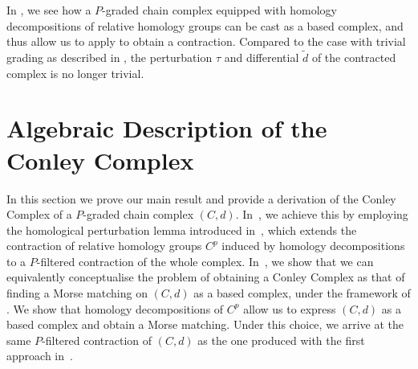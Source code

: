 \documentclass[11pt, table, nothms]{amsart}
\theoremstyle{definition}
\begin{document}
{In , we see how a $P$-graded chain complex equipped with homology decompositions of relative homology groups can be cast as a based complex, and thus allow us to apply  to obtain a contraction. Compared to the case with trivial grading as described in , the perturbation $\tau$ and  differential $\widetilde{d}$  of the contracted complex is no longer trivial. 


\section{Algebraic Description of the Conley Complex}
In this section we prove our main result and provide a derivation of the Conley Complex of a $P$-graded chain complex $(C,d)$. In~, we achieve this by employing the homological perturbation lemma introduced in~, which extends the contraction of relative homology groups $C^p$ induced by homology decompositions to a $P$-filtered contraction of the whole complex. In~, we show that we can equivalently conceptualise the problem of obtaining a Conley Complex as that of finding a Morse matching on $(C,d)$ as a based complex, under the framework of . We show that homology decompositions of $C^p$ allow us to express $(C,d)$ as a based complex and obtain a Morse matching. Under this choice, we arrive at the same $P$-filtered contraction of $(C,d)$ as the one produced with the first approach in~.

\label{sec:connectionmatrix}
}
\end{document}
